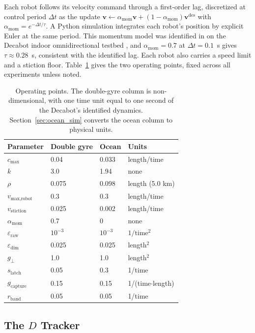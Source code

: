 \documentclass[lettersize,journal]{IEEEtran}
\begin{document}
Each robot follows its velocity command through a first-order lag,
discretized at control period $\Delta t$ as the update
$\mathbf{v} \leftarrow \alpha_{\text{mom}}\mathbf{v} + (1 -
\alpha_{\text{mom}})\mathbf{v}^{\text{des}}$ with
$\alpha_{\text{mom}} = e^{-\Delta t/\tau}$. A Python simulation integrates
each robot's position by explicit Euler at the same period. This momentum model was
identified in \cite{10} on the Decabot indoor omnidirectional testbed
\cite{31,32}, and $\alpha_{\text{mom}} = 0.7$ at $\Delta t = 0.1$~s gives
$\tau \approx 0.28$~s, consistent with the identified lag. Each robot also
carries a speed limit and a stiction floor. Table~\ref{tab:params} gives
the two operating points, fixed across all experiments unless noted.

\begin{table}[!t]
\caption{Operating points. The double-gyre column is non-dimensional,
with one time unit equal to one second of the Decabot's identified
dynamics. Section~\ref{sec:ocean_sim} converts the ocean column to
physical units.}
\label{tab:params}
\centering
\begin{tabular}{llll}
\hline
Parameter & Double gyre & Ocean & Units \\
\hline
$c_{\max}$              & 0.04  & 0.033  & length/time \\
$k$                     & 3.0   & 1.94   & none \\
$\rho$                  & 0.075 & 0.098  & length (5.0 km) \\
$v_{\text{max,robot}}$  & 0.3   & 0.3    & length/time \\
$v_{\text{stiction}}$   & 0.025 & 0.002  & length/time \\
$\alpha_{\text{mom}}$   & 0.7   & 0      & none \\
$\varepsilon_{\text{raw}}$ & $10^{-3}$ & $10^{-3}$ & $1/\text{time}^2$ \\
$\varepsilon_{\dim}$    & 0.025 & 0.025  & length$^2$ \\
$g_\perp$               & 1.0   & 1.0    & length$^2$ \\
$s_{\mathrm{latch}}$     & 0.05  & 0.3    & 1/time \\
$g_{\text{capture}}$    & 0.15  & 0.15   & 1/(time$\cdot$length) \\
$r_{\text{band}}$       & 0.05  & 0.05   & 1/time \\
\hline
\end{tabular}
\end{table}

\subsection{The $D$ Tracker}
\label{sec:sep_controller}
\end{document}
